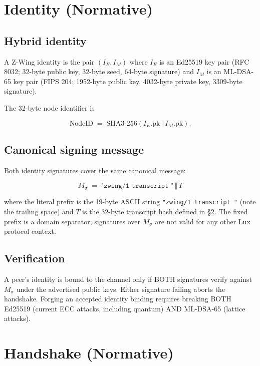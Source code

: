 \documentclass[11pt,a4paper]{article}
\begin{document}
\section{Identity (Normative)}

\subsection{Hybrid identity}

A Z-Wing identity is the pair $(I_E, I_M)$ where $I_E$ is an Ed25519 key
pair (RFC 8032; 32-byte public key, 32-byte seed, 64-byte signature) and
$I_M$ is an ML-DSA-65 key pair (FIPS 204; 1952-byte public key,
4032-byte private key, 3309-byte signature).

The 32-byte node identifier is

\begin{equation}
\mathrm{NodeID} \;=\; \mathrm{SHA3\text{-}256}\!\left( I_E.\mathrm{pk} \,\Vert\, I_M.\mathrm{pk} \right) .
\end{equation}

\subsection{Canonical signing message}

Both identity signatures cover the same canonical message:

\begin{equation}
M_{\sigma} \;=\; \texttt{"zwing/1 transcript "} \,\Vert\, T
\end{equation}

where the literal prefix is the 19-byte ASCII string \texttt{"zwing/1
transcript "} (note the trailing space) and $T$ is the 32-byte
transcript hash defined in \S\ref{sec:handshake}.
The fixed prefix is a domain separator; signatures over $M_{\sigma}$
are not valid for any other Lux protocol context.

\subsection{Verification}

A peer's identity is bound to the channel only if BOTH signatures
verify against $M_{\sigma}$ under the advertised public keys. Either
signature failing aborts the handshake. Forging an accepted identity
binding requires breaking BOTH Ed25519 (current ECC attacks, including
quantum) AND ML-DSA-65 (lattice attacks).

\section{Handshake (Normative)}
\label{sec:handshake}
\end{document}
